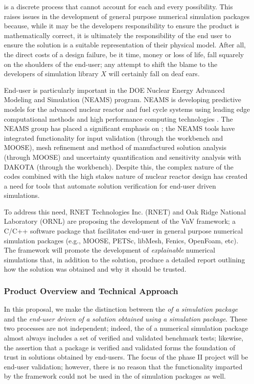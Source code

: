 \VV is a discrete process that cannot account for each and every possibility. This raises issues in the development of general purpose numerical simulation packages because, while it may be the developers responsibility to ensure the product is mathematically correct, it is ultimately the responsibility of the end user to ensure the solution is a suitable representation of their physical model. After all, the direct costs of a design failure, be it time, money or loss of life, fall squarely on the shoulders of the end-user; any attempt to shift the blame to the developers of simulation library $X$ will certainly fall on deaf ears. 

End-user \VV is particularly important in the DOE Nuclear Energy Advanced Modeling and Simulation (NEAMS) program. NEAMS is developing predictive models for the advanced nuclear reactor and fuel cycle systems using leading edge computational methods and high performance computing technologies \cite{NEAMS}. The NEAMS group has placed a significant emphasis on \VV \cite{neams-vv}; the NEAMS tools have integrated functionality for input validation (through the workbench and MOOSE), mesh refinement and method of manufactured solution analysis (through MOOSE) and uncertainty quantification and sensitivity analysis with DAKOTA (through the workbench). Despite this, the complex nature of the codes combined with the high stakes nature of nuclear reactor design has created a need for tools that automate solution verification for end-user driven simulations. 

To address this need, RNET Technologies Inc. (RNET) and Oak Ridge National Laboratory (ORNL) are proposing the development of the VnV framework; a C/C++ software package that facilitates end-user \VV in general purpose numerical simulation packages (e.g., MOOSE, PETSc, libMesh, Fenics, OpenFoam, etc). The framework will promote the development of \emph{explainable} numerical simulations that, in addition to the solution, produce a detailed report outlining how the solution was obtained and why it should be trusted. 

\subsubsection{Product Overview and Technical Approach}

In this proposal, we make the distinction between the \emph{\VV of a simulation package} and the \emph{end-user driven \VV of a solution obtained using a simulation package}. These two processes are not independent; indeed, the \VV of a numerical simulation 
package almost always includes a set of verified and validated benchmark tests; likewise, the assertion that a package is verified and validated forms the foundation of trust in solutions obtained by end-users. The focus of the phase II project will be end-user validation; however, there is no reason that the functionality imparted by the framework could not be used in the \VV of simulation packages as well. 

